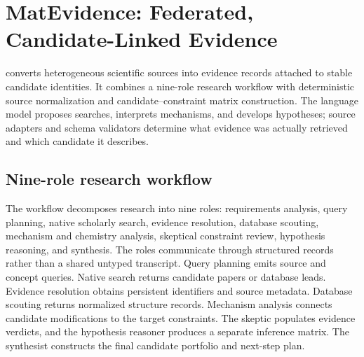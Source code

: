 \section{MatEvidence: Federated, Candidate-Linked Evidence}
\label{sec:matevidence}

\matevidence converts heterogeneous scientific sources into evidence records attached to stable candidate identities.  It combines a nine-role research workflow with deterministic source normalization and candidate--constraint matrix construction.  The language model proposes searches, interprets mechanisms, and develops hypotheses; source adapters and schema validators determine what evidence was actually retrieved and which candidate it describes.

\subsection{Nine-role research workflow}

The workflow decomposes research into nine roles: requirements analysis, query planning, native scholarly search, evidence resolution, database scouting, mechanism and chemistry analysis, skeptical constraint review, hypothesis reasoning, and synthesis.  The roles communicate through structured records rather than a shared untyped transcript.  Query planning emits source and concept queries.  Native search returns candidate papers or database leads.  Evidence resolution obtains persistent identifiers and source metadata.  Database scouting returns normalized structure records.  Mechanism analysis connects candidate modifications to the target constraints.  The skeptic populates evidence verdicts, and the hypothesis reasoner produces a separate inference matrix.  The synthesist constructs the final candidate portfolio and next-step plan.

